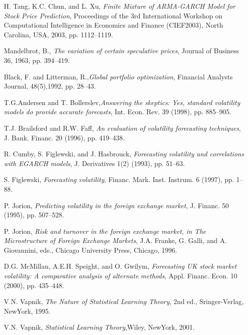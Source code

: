 \begin{thebibliography}{9}
H. Tang, K.C. Chun, and L. Xu, \textit{Finite Mixture of ARMA-GARCH Model for Stock Price Prediction}, Proceedings of the 3rd International Workshop on Computational Intelligence in Economics and Finance (CIEF2003), North
Carolina, USA, 2003, pp. 1112–1119.

Mandelbrot, B., \textit{The variation of certain speculative prices}, Journal of Business 36, 1963, pp. 394–419.

Black, F. and Litterman, R.,\textit{Global portfolio optimization}, Financial Analysts Journal, 48(5),1992, pp. 28–43.

T.G.Andersen and T. Bollerslev,\textit{Answering the skeptics: Yes, standard volatility models do provide accurate forecasts}, Int. Econ. Rev. 39 (1998), pp. 885–905.

T.J. Brailsford and R.W. Faff, \textit{An evaluation of volatility forecasting techniques}, J. Bank. Financ. 20 (1996), pp. 419–438.

R. Cumby, S. Figlewski, and J. Hasbrouck, \textit{Forecasting volatility and correlations with EGARCH models}, J. Derivatives 1(2) (1993), pp. 51–63.

S. Figlewski, \textit{Forecasting volatility}, Financ. Mark. Inst. Instrum. 6 (1997), pp. 1–88.

P. Jorion, \textit{Predicting volatility in the foreign exchange market}, J. Financ. 50 (1995), pp. 507–528.

 P. Jorion, \textit{Risk and turnover in the foreign exchange market, in The Microstructure of Foreign Exchange Markets}, J.A. Franke, G. Galli, and A. Giovannini, eds., Chicago University Press, Chicago, 1996.

D.G. McMillan, A.E.H. Speight, and O. Gwilym, \textit{Forecasting UK stock market volatility: A comparative analysis of alternate methods}, Appl. Financ. Econ. 10 (2000), pp. 435–448.

V.N. Vapnik, \textit{The Nature of Statistical Learning Theory}, 2nd ed., Sringer-Verlag, NewYork, 1995.


V.N. Vapnik, \textit{Statistical Learning Theory},Wiley, NewYork, 2001.

\end{thebibliography}